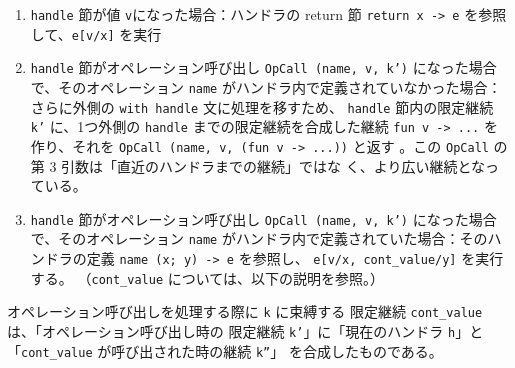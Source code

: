 \begin{enumerate}
\item \texttt{handle} 節が値 \texttt{v}になった場合：ハンドラの return 節 \texttt{return x -> e} を参照して、\texttt{e[v/x]} を実行
\item \texttt{handle} 節がオペレーション呼び出し \texttt{OpCall (name, v, k')} になった場合で、そのオペレーション \texttt{name} がハンドラ内で定義されていなかった場合：
さらに外側の \texttt{with handle} 文に処理を移すため、
\texttt{handle} 節内の限定継続 \texttt{k'} に、1つ外側の \texttt{handle} までの限定継続を合成した継続 \texttt{fun v -> ...} を作り、それを \texttt{OpCall (name, v, (fun v -> ...))} と返す
。この \texttt{OpCall} の第 3 引数は「直近のハンドラまでの継続」ではな
く、より広い継続となっている。
\item \texttt{handle} 節がオペレーション呼び出し \texttt{OpCall (name, v, k')} になった場合で、そのオペレーション \texttt{name} がハンドラ内で定義されていた場合：そのハンドラの定義 \texttt{name (x; y) -> e} を参照し、
\texttt{e[v/x, cont\_value/y]} を実行する。
（\texttt{cont\_value} については、以下の説明を参照。）
\end{enumerate}

オペレーション呼び出しを処理する際に \texttt{k} に束縛する
限定継続 \texttt{cont\_value} は、「オペレーション呼び出し時の
限定継続 \texttt{k'}」に「現在のハンドラ \texttt{h}」と
「\texttt{cont\_value} が呼び出された時の継続 \texttt{k''}」
を合成したものである。

